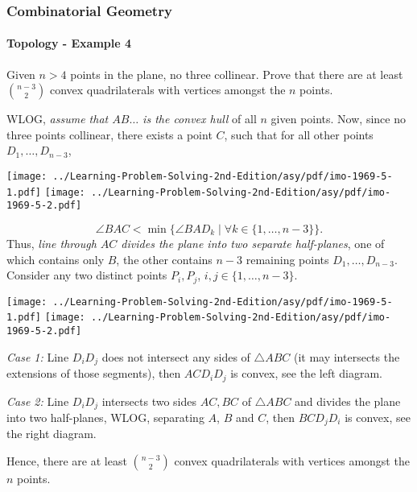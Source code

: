 \documentclass[8pt,xcolor=table,dvipsnames]{beamer}
\begin{document}
\begin{frame}[t]
    \frametitle{Combinatorial Geometry}
    \framesubtitle{Topology - Example 4}
    \begin{example}[IMO 1969/5]
        Given $n>4$ points in the plane, no three collinear.
        Prove that there are at least $\binom{n-3}{2}$ convex quadrilaterals with vertices amongst the $n$ points.
    \end{example}
    \begin{overprint}
        WLOG, \textit{assume that $AB\ldots$ is the convex hull} of all $n$ given points.
        Now, since no three points collinear, there exists a point $C$, such that for all other points $D_1,\ldots,D_{n-3}$,
        \begin{center}
            \texttt{[image: ../Learning-Problem-Solving-2nd-Edition/asy/pdf/imo-1969-5-1.pdf]}
            \quad
            \texttt{[image: ../Learning-Problem-Solving-2nd-Edition/asy/pdf/imo-1969-5-2.pdf]}
        \end{center}
        \[ 
            \angle BAC < \min \{ \angle BAD_k \mid \forall k \in \{ 1,\ldots, n-3 \} \}.
        \]
        Thus, \textit{line through $AC$ divides the plane into two separate half-planes},
        one of which contains only $B$, the other contains $n-3$ remaining points $D_1,\ldots,D_{n-3}.$
        Consider any two distinct points $P_i,P_j$, $i,j \in \{ 1,\ldots, n-3 \}.$
        \begin{center}
            \texttt{[image: ../Learning-Problem-Solving-2nd-Edition/asy/pdf/imo-1969-5-1.pdf]}
            \quad
            \texttt{[image: ../Learning-Problem-Solving-2nd-Edition/asy/pdf/imo-1969-5-2.pdf]}
        \end{center}
        \textit{Case 1:} Line $D_iD_j$ does not intersect any sides of $\triangle ABC$
        (it may intersects the extensions of those segments), then $ACD_iD_j$ is convex, see the left diagram.
    
        \textit{Case 2:} Line $D_iD_j$ intersects two sides $AC,BC$ of $\triangle ABC$
        and divides the plane into two half-planes, WLOG, separating $A$, $B$ and $C$, then $BCD_jD_i$ is convex, see the right diagram.
    
        Hence, there are at least $\binom{n-3}{2}$  convex quadrilaterals with vertices amongst the $n$ points. 
    \end{overprint}
\end{frame}
\end{document}
